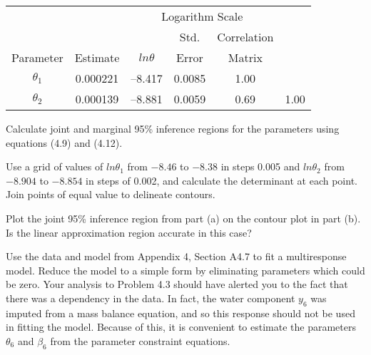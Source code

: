 \begin{problems}
  \begin{center}
    \begin{tabular}{ccrccc} \hline
      && \multicolumn{3}{c}{Logarithm Scale}\\
      &&& \multicolumn{1}{c}{Std.} & \multicolumn{1}{c}{Correlation}\\
      \multicolumn{1}{c}{Parameter} & \multicolumn{1}{c}{Estimate} &
      \multicolumn{1}{c}{$ln\theta$}& \multicolumn{1}{c}{Error} &
      \multicolumn{1}{c}{Matrix}\\ \hline
      $\theta_{1}$&0.000221&--8.417&0.0085&1.00\\
      $\theta_{2}$&0.000139&--8.881&0.0059&0.69&1.00\\ \hline
    \end{tabular}
  \end{center}

  \subprob Calculate joint and marginal 95\% inference regions for the
  parameters using equations (4.9) and (4.12).
  
  \subprob Use a grid of values of $ln\theta_1 $ from $-8.46$ to
  $-8.38$ in steps 0.005 and $ln\theta_2 $ from $-8.904$ to $-8.854$
  in steps of 0.002, and calculate the determinant at each point.
  Join points of equal value to delineate contours.
  
  \subprob Plot the joint 95\% inference region from part (a) on the
  contour plot in part (b).  Is the linear approximation region
  accurate in this case?
  
  \prob Use the data and model from Appendix 4, Section A4.7 to fit a
  multiresponse model.  Reduce the model to a simple form by
  eliminating parameters which could be zero.  Your analysis to
  Problem 4.3 should have alerted you to the fact that there was a
  dependency in the data.  In fact, the water component $y_{6}$ was
  imputed from a mass balance equation, and so this response should
  not be used in fitting the model.  Because of this, it is convenient
  to estimate the parameters $\theta_{6}$ and $\beta_{6}$ from the
  parameter constraint equations.
\end{problems}


